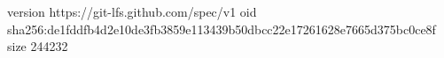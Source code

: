 version https://git-lfs.github.com/spec/v1
oid sha256:de1fddfb4d2e10de3fb3859e113439b50dbcc22e17261628e7665d375bc0ce8f
size 244232
